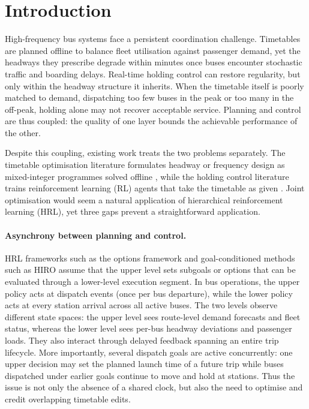 \section{Introduction}
\label{sec:intro}

High-frequency bus systems face a persistent coordination challenge.
Timetables are planned offline to balance fleet utilisation against passenger demand, yet the headways they prescribe degrade within minutes once buses encounter stochastic traffic and boarding delays.
Real-time holding control can restore regularity, but only within the headway structure it inherits.
When the timetable itself is poorly matched to demand, dispatching too few buses in the peak or too many in the off-peak, holding alone may not recover acceptable service.
Planning and control are thus coupled: the quality of one layer bounds the achievable performance of the other.

Despite this coupling, existing work treats the two problems separately.
The timetable optimisation literature formulates headway or frequency design as mixed-integer programmes solved offline \citep{gkiotsalitis2021bus}, while the holding control literature trains reinforcement learning (RL) agents that take the timetable as given \citep{wang2020real,zhang2026single}.
Joint optimisation would seem a natural application of hierarchical reinforcement learning (HRL), yet three gaps prevent a straightforward application.

\paragraph{Asynchrony between planning and control.}
HRL frameworks such as the options framework \citep{sutton1999between} and goal-conditioned methods such as HIRO \citep{nachum2018data} assume that the upper level sets subgoals or options that can be evaluated through a lower-level execution segment.
In bus operations, the upper policy acts at dispatch events (once per bus departure), while the lower policy acts at every station arrival across all active buses.
The two levels observe different state spaces: the upper level sees route-level demand forecasts and fleet status, whereas the lower level sees per-bus headway deviations and passenger loads.
They also interact through delayed feedback spanning an entire trip lifecycle.
More importantly, several dispatch goals are active concurrently: one upper decision may set the planned launch time of a future trip while buses dispatched under earlier goals continue to move and hold at stations.
Thus the issue is not only the absence of a shared clock, but also the need to optimise and credit overlapping timetable edits.

